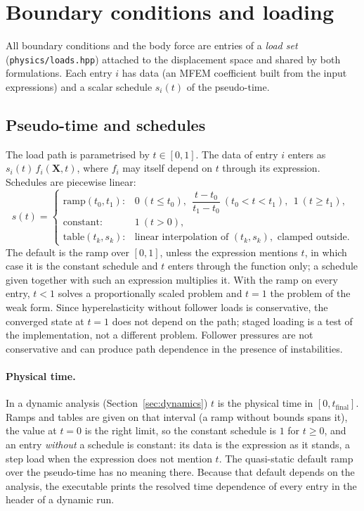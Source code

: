 \documentclass[11pt]{article}
\newcommand{\bX}{\bm{X}}
\DeclareRobustCommand{\file}[1]{{\def\_{\textunderscore\allowbreak}\texttt{#1}}}
\begin{document}
\section{Boundary conditions and loading}
\label{sec:loads}

All boundary conditions and the body force are entries of a \emph{load
set} (\file{physics/loads.hpp}) attached to the displacement space and
shared by both formulations.  Each entry $i$ has data (an MFEM coefficient
built from the input expressions) and a scalar schedule $s_i(t)$ of the
pseudo-time.

\subsection{Pseudo-time and schedules}

The load path is parametrised by $t \in [0, 1]$.  The data of entry $i$
enters as $s_i(t)\,f_i(\bX, t)$, where $f_i$ may itself depend on $t$
through its expression.  Schedules are piecewise linear:
\begin{equation}
  s(t) = \begin{cases}
  \text{ramp}(t_0, t_1): & 0 \ (t \le t_0),\ \ \dfrac{t - t_0}{t_1 - t_0}\ (t_0 < t < t_1),\ \ 1 \ (t \ge t_1), \\[6pt]
  \text{constant}: & 1 \ (t > 0), \\[2pt]
  \text{table}(t_k, s_k): & \text{linear interpolation of } (t_k, s_k), \text{ clamped outside}.
  \end{cases}
\end{equation}
The default is the ramp over $[0, 1]$, unless the expression mentions $t$,
in which case it is the constant schedule and $t$ enters through the
function only; a schedule given together with such an expression
multiplies it.  With the ramp on every entry, $t < 1$ solves a
proportionally scaled problem and $t = 1$ the problem of the weak form.
Since hyperelasticity without follower loads is conservative, the converged
state at $t = 1$ does not depend on the path; staged loading is a test of
the implementation, not a different problem.  Follower pressures are not
conservative and can produce path dependence in the presence of
instabilities.

\paragraph{Physical time.}
In a dynamic analysis (Section~\ref{sec:dynamics}) $t$ is the physical time
in $[0, t_{\text{final}}]$.  Ramps and tables are given on that interval (a
ramp without bounds spans it), the value at $t = 0$ is the right limit, so
the constant schedule is $1$ for $t \ge 0$, and an entry \emph{without} a
schedule is constant: its data is the expression as it stands, a step load
when the expression does not mention $t$.  The quasi-static default ramp
over the pseudo-time has no meaning there.  Because that default depends on
the analysis, the executable prints the resolved time dependence of every
entry in the header of a dynamic run.
\end{document}
